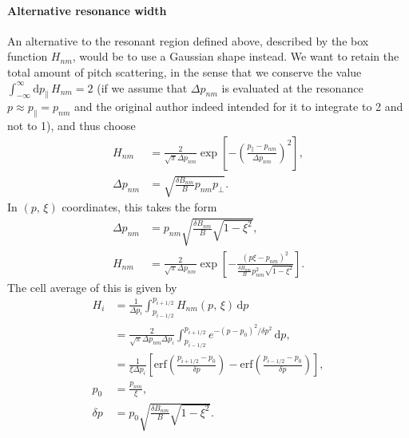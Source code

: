 \documentclass[11pt,a4paper]{article}
\newcommand{\rd}{\ensuremath{\mathrm{d}}}
\begin{document}
\paragraph{Alternative resonance width}
An alternative to the resonant region defined above, described by the box function $H_{nm}$, would be to use a Gaussian shape instead. We want to retain the total amount of pitch scattering, in the sense that we conserve the value $\int_{-\infty}^\infty \rd p_\parallel \,H_{nm} = 2$ (if we assume that $\Delta p_{nm}$ is evaluated at the resonance $p \approx p_\parallel = p_{nm}$ and the original author indeed intended for it to integrate to 2 and not to 1), and thus choose
\begin{align}
H_{nm} &=  \frac{2}{ \sqrt{\pi} \Delta p_{nm}} \exp\left[ - \left(\frac{p_\parallel - p_{nm}}{\Delta p_{nm}}\right)^2\right], \nonumber \\
\Delta p_{nm} &= \sqrt{\frac{\delta B_{nm}}{B}p_{nm}p_\perp }.
\end{align}
In $(p,\,\xi)$ coordinates, this takes the form
\begin{align}
\Delta p_{nm} &= p_{nm}\sqrt{\frac{\delta B_{nm}}{B}\sqrt{1-\xi^2}}, \nonumber \\
H_{nm} &=  \frac{2}{ \sqrt{\pi} \Delta p_{nm}} \exp\left[ - \frac{(p\xi - p_{nm})^2}{\frac{\delta B_{nm}}{B} p_{nm}^2\sqrt{1-\xi^2}}\right].
\end{align}
The cell average of this is given by
\begin{align}
H_i &= \frac{1}{\Delta p_i}\int_{p_{i-1/2}}^{p_{i+1/2}} H_{nm}(p,\,\xi) \, \rd p  \nonumber \\
&= \frac{2}{\sqrt{\pi}\Delta p_{nm} \Delta p_i} \int_{p_{i-1/2}}^{p_{i+1/2}} e^{-(p-p_0)^2/\delta p^2} \, \rd p , \nonumber \\
&= \frac{1}{\xi \Delta p_i} \left[ \text{erf}\left(\frac{p_{i+1/2}-p_0}{\delta p}\right) - \text{erf}\left(\frac{p_{i-1/2}-p_0}{\delta p}\right) \right], \nonumber \\
p_0 &= \frac{p_{nm}}{\xi}, \nonumber \\
\delta p &= p_0 \sqrt{\frac{\delta B_{nm}}{B}\sqrt{1-\xi^2}}.
\end{align}
\end{document}

